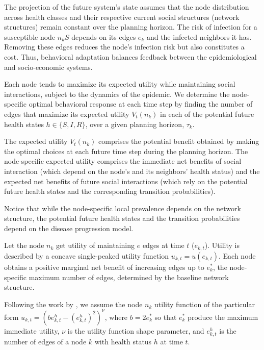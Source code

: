 \documentclass[9pt,twocolumn,twoside]{pnas-new}
\begin{document}
The projection of the future system's state assumes that the node distribution across health classes and their respective current social structures (network structures) remain constant over the planning horizon. The risk of infection for a susceptible node $n_kS$ depends on its edges $e_k$ and the infected neighbors it has. Removing these edges reduces the node's infection risk but also constitutes a cost. Thus, behavioral adaptation balances feedback between the epidemiological and socio-economic systems.

Each node tends to maximize its expected utility while maintaining social interactions, subject to the dynamics of the epidemic. We determine the node-specific optimal behavioral response at each time step by finding the number of edges that maximize its expected utility $V_t(n_k)$ in each of the potential future health states $h\in \{S,I,R\}$, over a given planning horizon, $\tau_k$.

The expected utility $V_t(n_k)$ comprises the potential benefit obtained by making the optimal choices at each future time step during the planning horizon. The node-specific expected utility comprises the immediate net benefits of social interaction (which depend on the node's and its neighbors' health status) and the expected net benefits of future social interactions (which rely on the potential future health states and the corresponding transition probabilities).

Notice that while the node-specific local prevalence depends on the network structure, the potential future health states and the transition probabilities depend on the disease progression model.


Let the node $n_k$ get utility of maintaining $e$ edges at time $t$ ($e_{k,t}$). Utility is described by a concave single-peaked utility function $u_{k,t}=u(e_{k,t})$. Each node obtains a positive marginal net benefit of increasing edges up to $e_k^*$, the node-specific maximum number of edges, determined by the baseline network structure.

Following the work by \cite{morin2013sir}, we assume the node $n_k$ utility function of the particular form $u_{k,t}=\left(b e_{k,t}^{h}-(e_{k,t}^{h})^ 2\right)^{\nu}$, where $b=2 e_k^*$ so that $e_k^*$ produce the maximum immediate utility, $\nu$ is the utility function shape parameter, and $e_{k,t}^{h}$ is the number of edges of a node $k$ with health status $h$ at time $t$.
\end{document}
